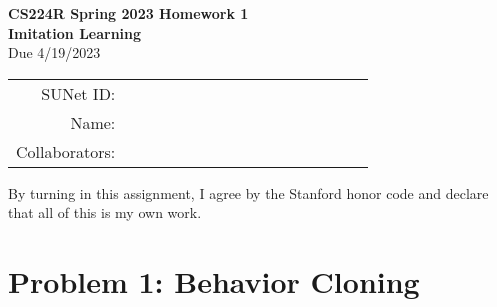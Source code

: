 \documentclass[12pt]{article}
\begin{document}
\begin{center}
{\Large \textbf{CS224R Spring 2023 Homework 1 \\ Imitation Learning}}
\\ {\large Due 4/19/2023}

\begin{tabular}{rl}
SUNet ID: & $\hspace{6cm}$\\
Name: & \\
Collaborators: & 
\end{tabular}
\end{center}

\noindent By turning in this assignment, I agree by the Stanford honor code and declare
that all of this is my own work.


\newpage
\section*{Problem 1: Behavior Cloning}
\end{document}
